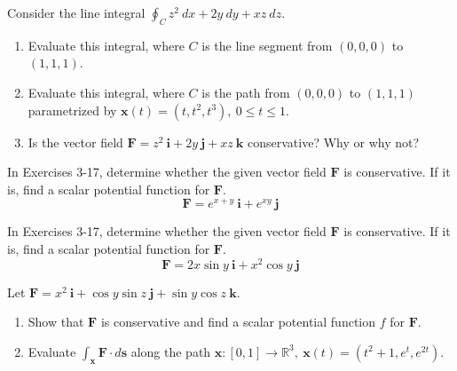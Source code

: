 \documentclass[12pt,letterpaper]{hmcpset}
\newcommand{\bb}[1]{\mathbb{#1}}
\renewcommand{\bf}[1]{\mathbf{#1}}
\begin{document}
\begin{problem}[Colley 6.3.1]
    Consider the line integral $\oint_Cz^2~dx+2y~dy+xz~dz$.
    \begin{enumerate}
        \item Evaluate this integral, where $C$ is the line segment
            from $(0,0,0)$ to $(1,1,1)$.
        \item Evaluate this integral, where $C$ is the path from
            $(0,0,0)$ to $(1,1,1)$ parametrized by
            $\bf{x}(t)=(t,t^2,t^3),~0\leq t\leq1$.
        \item Is the vector field
            $\bf{F}=z^2~\bf{i}+2y~\bf{j}+xz~\bf{k}$ conservative? Why
            or why not?
    \end{enumerate}
\end{problem}
\begin{solution}
    \vfill
\end{solution}
\newpage

\begin{problem}[Colley 6.3.3]
    In Exercises 3-17, determine whether the given vector field
    $\bf{F}$ is conservative. If it is, find a scalar potential
    function for $\bf{F}$.
    \[
        \bf{F}=e^{x+y}~\bf{i}+e^{xy}~\bf{j}
    \]
\end{problem}
\begin{solution}
    \vfill
\end{solution}
\newpage

\begin{problem}[Colley 6.3.4]
    In Exercises 3-17, determine whether the given vector field
    $\bf{F}$ is conservative. If it is, find a scalar potential
    function for $\bf{F}$.
    \[
        \bf{F}=2x\sin y~\bf{i}+x^2\cos y~\bf{j}
    \]
\end{problem}
\begin{solution}
    \vfill
\end{solution}
\newpage

\begin{problem}[Colley 6.3.25]
    Let $\bf{F}=x^2~\bf{i}+\cos y\sin z~\bf{j}+\sin y\cos z~\bf{k}$.
    \begin{enumerate}
        \item Show that $\bf{F}$ is conservative and find a scalar
            potential function $f$ for $\bf{F}$.
        \item Evaluate $\int_{\bf{x}}\bf{F}\cdot d\bf{s}$ along the
            path $\bf{x}:[0,1]\to
            \bb{R}^3,~\bf{x}(t)=(t^2+1,e^t,e^{2t})$.
    \end{enumerate}
\end{problem}
\begin{solution}
    \vfill
\end{solution}
\newpage
\end{document}
